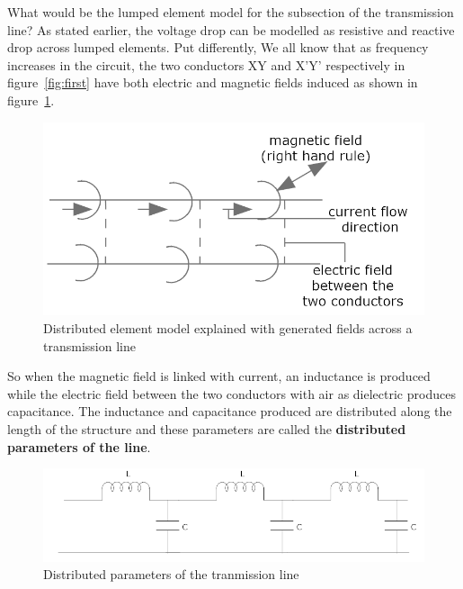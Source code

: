 What would be the lumped element model for the subsection of the transmission line? As stated earlier, the voltage drop can be modelled as resistive and reactive drop across lumped elements. Put differently, We all know that as frequency increases in the circuit, the two conductors XY and X'Y' respectively in figure~\ref{fig:first} have both electric and magnetic fields induced as shown in figure~\ref{fig:third}.
\begin{figure}[h]
\centering
\includegraphics[width=1\linewidth]{./graphics/third}
\caption{Distributed element model explained with generated fields across a transmission line}
\label{fig:third}
\end{figure}

So when the magnetic field is linked with current, an inductance is produced while the electric field between the two conductors with air as dielectric produces capacitance. The inductance and capacitance produced are distributed along the length of the structure and these parameters are called the \textbf{distributed parameters of the line}.
\begin{figure}[h]
\centering
\includegraphics[width=1\linewidth]{./graphics/fifth}
\caption{Distributed parameters of the tranmission line}
\end{figure}

